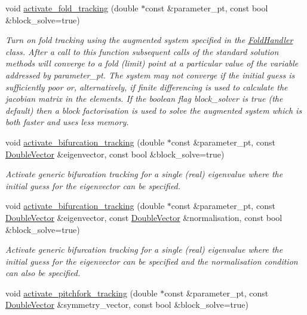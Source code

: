 \begin{DoxyCompactItemize}
void \hyperlink{classoomph_1_1Problem_acf20e92281911dfbb423ea82542c0485}{activate\+\_\+fold\+\_\+tracking} (double $\ast$const \&parameter\+\_\+pt, const bool \&block\+\_\+solve=true)
\begin{DoxyCompactList}\small\item\em Turn on fold tracking using the augmented system specified in the \hyperlink{classoomph_1_1FoldHandler}{Fold\+Handler} class. After a call to this function subsequent calls of the standard solution methods will converge to a fold (limit) point at a particular value of the variable addressed by parameter\+\_\+pt. The system may not converge if the initial guess is sufficiently poor or, alternatively, if finite differencing is used to calculate the jacobian matrix in the elements. If the boolean flag block\+\_\+solver is true (the default) then a block factorisation is used to solve the augmented system which is both faster and uses less memory. \end{DoxyCompactList}\item 
void \hyperlink{classoomph_1_1Problem_a95359def89a0ee3d3df8976ab54c6591}{activate\+\_\+bifurcation\+\_\+tracking} (double $\ast$const \&parameter\+\_\+pt, const \hyperlink{classoomph_1_1DoubleVector}{Double\+Vector} \&eigenvector, const bool \&block\+\_\+solve=true)
\begin{DoxyCompactList}\small\item\em Activate generic bifurcation tracking for a single (real) eigenvalue where the initial guess for the eigenvector can be specified. \end{DoxyCompactList}\item 
void \hyperlink{classoomph_1_1Problem_a4610ef4c4f4d7c1d7001fabf074c930c}{activate\+\_\+bifurcation\+\_\+tracking} (double $\ast$const \&parameter\+\_\+pt, const \hyperlink{classoomph_1_1DoubleVector}{Double\+Vector} \&eigenvector, const \hyperlink{classoomph_1_1DoubleVector}{Double\+Vector} \&normalisation, const bool \&block\+\_\+solve=true)
\begin{DoxyCompactList}\small\item\em Activate generic bifurcation tracking for a single (real) eigenvalue where the initial guess for the eigenvector can be specified and the normalisation condition can also be specified. \end{DoxyCompactList}\item 
void \hyperlink{classoomph_1_1Problem_a7f5eb1f88a957cb3d8a11b558002d484}{activate\+\_\+pitchfork\+\_\+tracking} (double $\ast$const \&parameter\+\_\+pt, const \hyperlink{classoomph_1_1DoubleVector}{Double\+Vector} \&symmetry\+\_\+vector, const bool \&block\+\_\+solve=true)

\end{DoxyCompactItemize}
